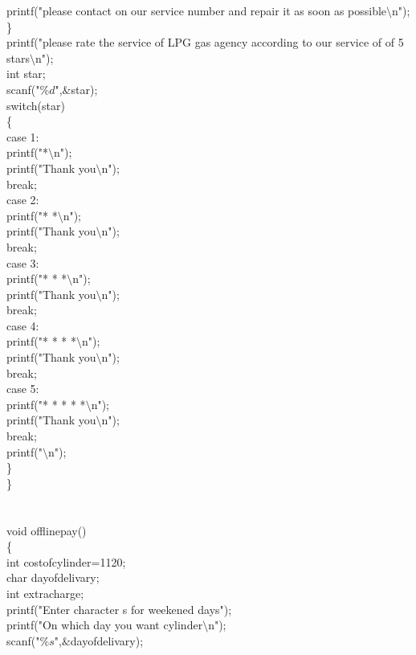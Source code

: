 \documentclass{article}
\begin{document}
{		printf("please contact on our service number and repair it as soon as possible$\setminus$n");\\
	\}\\
	printf("please rate the service of LPG gas agency according to our service of of 5 stars$\setminus$n");\\
	int star;\\
	scanf("$\%d$",$\&$star);\\
	switch(star)\\
	\{\\
		case 1:\\
			printf("*$\setminus$n");\\
			printf("Thank you$\setminus$n");\\
			break;\\
		case 2:\\
			printf("* *$\setminus$n");\\
			printf("Thank you$\setminus$n");\\
			break;\\
		case 3:\\
			printf("* * *$\setminus$n");\\
			printf("Thank you$\setminus$n");\\
			break;\\
		case 4:\\
			printf("* * * *$\setminus$n");\\
			printf("Thank you$\setminus$n");\\
			break;\\
		case 5:\\
			printf("* * * * *$\setminus$n");\\
			printf("Thank you$\setminus$n");\\
			break;\\
			printf("$\setminus$n");\\	
	\}\\
\}\\
\\
\\
void offlinepay()\\
\{\\
	int costofcylinder=1120;\\
	char dayofdelivary;\\
	int extracharge;\\
	printf("Enter character s for weekened days");\\
	printf("On which day you want cylinder$\setminus$n");\\
	scanf("$\%s$",$\&$dayofdelivary);\\
}
\end{document}
